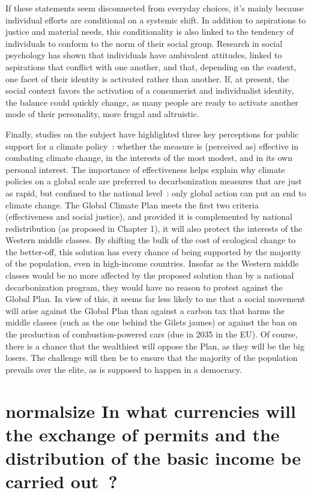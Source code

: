 \documentclass[a5paper,french,openany]{memoir}
\begin{document}
{If these statements seem disconnected from everyday choices, it's mainly because individual efforts are conditional on a systemic shift. In addition to aspirations to justice and material needs, this conditionality is also linked to the tendency of individuals to conform to the norm of their social group. Research in social psychology has shown that individuals have ambivalent attitudes, linked to aspirations that conflict with one another, and that, depending on the context, one facet of their identity is activated rather than another. %
If, at present, the social context favors the activation of a consumerist and individualist identity, the balance could quickly change, as many people are ready to activate another mode of their personality, more frugal and altruistic.

Finally, studies on the subject have highlighted three key perceptions for public support for a climate policy~: whether the measure is (perceived as) effective in combating climate change, in the interests of the most modest, and in its own personal interest. The importance of effectiveness helps explain why climate policies on a global scale are preferred to decarbonization measures that are just as rapid, but confined to the national level~: only global action can put an end to climate change. The Global Climate Plan meets the first two criteria (effectiveness and social justice), and provided it is complemented by national redistribution (as proposed in Chapter 1), it will also protect the interests of the Western middle classes. By shifting the bulk of the cost of ecological change to the better-off, this solution has every chance of being supported by the majority of the population, even in high-income countries. Insofar as the Western middle classes would be no more affected by the proposed solution than by a national decarbonization program, they would have no reason to protest against the Global Plan. In view of this, it seems far less likely to me that a social movement will arise against the Global Plan than against a carbon tax that harms the middle classes (such as the one behind the Gilets jaunes) or against the ban on the production of combustion-powered cars (due in 2035 in the EU). Of course, there is a chance that the wealthiest will oppose the Plan, as they will be the big losers. The challenge will then be to ensure that the majority of the population prevails over the elite, as is supposed to happen in a democracy.


\section*{{normalsize In what currencies will the exchange of permits and the distribution of the basic income be carried out~?}\label{q:devise}}

}
\end{document}
